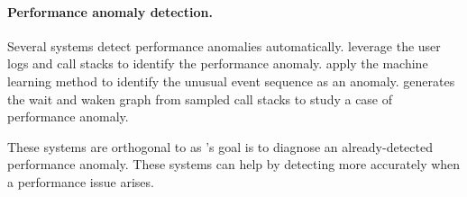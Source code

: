 \paragraph{Performance anomaly detection.}  Several systems detect performance
anomalies automatically.  \cite{han2012performance, yuan2012conservative}
leverage the user logs and call stacks to identify the performance anomaly.
\cite{cohen2004correlating, saidi2008full, xu2009detecting, du2017deeplog} apply
the machine learning method to identify the unusual event sequence as an
anomaly.  \cite{yu2014comprehending} generates the wait and waken graph from
sampled call stacks to study a case of performance anomaly.

These systems are orthogonal to \xxx as \xxx's goal is to diagnose an
already-detected performance anomaly.  These systems can help \xxx by detecting
more accurately when a performance issue arises.
